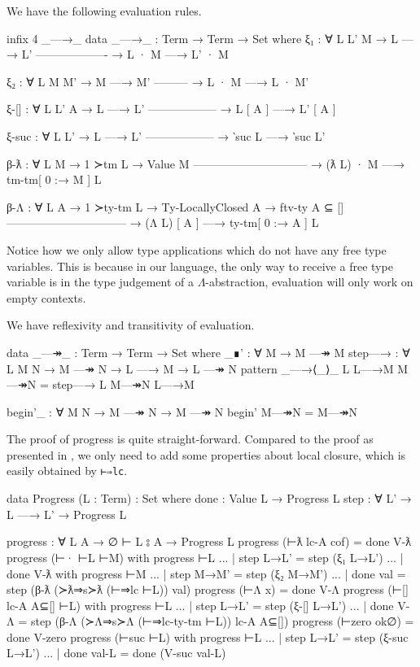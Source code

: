 \documentclass[logo,bsc,singlespacing,parskip,online]{infthesis}
\begin{document}
We have the following evaluation rules.
\begin{code}
  infix 4 _—→_
  data _—→_ : Term → Term → Set where
    ξ₁ : ∀ {L L' M}
      → L —→ L'
        -------------------
      → L · M —→ L' · M

    ξ₂ : ∀ {L M M'}
      → M —→ M'
        ---------
      → L · M —→ L · M'

    ξ-[] : ∀ {L L' A}
      → L —→ L'
        ------------------
      → L [ A ] —→ L' [ A ]

    ξ-suc : ∀ {L L'}
      → L —→ L'
        ------------------
      → ‵suc L —→ ‵suc L'

    β-ƛ : ∀ {L M}
      → 1 ≻tm L              → Value M
        ------------------------------
      → (ƛ L) · M —→ tm-tm[ 0 :→ M ] L

    β-Λ : ∀ {L A}
      → 1 ≻ty-tm L  → Ty-LocallyClosed A
      → ftv-ty A ⊆ []
        --------------------------------
      → (Λ L) [ A ] —→ ty-tm[ 0 :→ A ] L
\end{code}
Notice how we only allow type applications which do not have any free type variables. This is
because in our language, the only way to receive a free type variable is in the type judgement of a
$\Lambda$-abstraction, evaluation will only work on empty contexts.

We have reflexivity and transitivity of evaluation.
\begin{code}
  data _—↠_ : Term → Term → Set where
    _∎' : ∀ M → M —↠ M
    step—→ : ∀ L {M N} → M —↠ N → L —→ M → L —↠ N
  pattern _—→⟨_⟩_ L L—→M M—↠N = step—→ L M—↠N L—→M

  begin'_ : ∀ {M N} → M —↠ N → M —↠ N
  begin' M—↠N = M—↠N
\end{code}

The proof of progress is quite straight-forward. Compared to the proof as presented in
\citet{wadler_programming_2022}, we only need to add some properties about local closure, which is
easily obtained by \texttt{⊢⇒lc}.
\begin{code}
  data Progress (L : Term) : Set where
    done : Value L → Progress L
    step : ∀ {L'} → L —→ L' → Progress L

  progress : ∀ {L A} → ∅ ⊢ L ⦂ A → Progress L
  progress (⊢ƛ lc-A cof) = done V-ƛ
  progress (⊢· ⊢L ⊢M) with progress ⊢L
  ... | step L→L' = step (ξ₁ L→L')
  ... | done V-ƛ with progress ⊢M
  ...   | step M→M' = step (ξ₂ M→M')
  ...   | done val  = step (β-ƛ (≻ƛ⇒s≻ƛ (⊢⇒lc ⊢L)) val)
  progress (⊢Λ x) = done V-Λ
  progress (⊢[] lc-A A⊆[] ⊢L) with progress ⊢L
  ... | step L→L' = step (ξ-[] L→L')
  ... | done V-Λ = step (β-Λ (≻Λ⇒s≻Λ (⊢⇒lc-ty-tm ⊢L)) lc-A A⊆[])
  progress (⊢zero ok∅) = done V-zero
  progress (⊢suc ⊢L) with progress ⊢L
  ... | step L→L'  = step (ξ-suc L→L')
  ... | done val-L = done (V-suc val-L)
\end{code}
\end{document}
